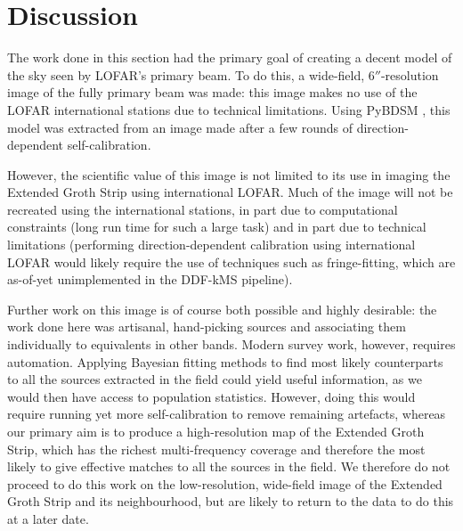 \section{Discussion}

\pg
The work done in this section had the primary goal of creating a decent model of the sky seen by LOFAR's primary beam. To do this, a wide-field, $6''$-resolution image of the fully primary beam was made: this image makes no use of the LOFAR international stations due to technical limitations. Using PyBDSM , this model was extracted from an image made after a few rounds of direction-dependent self-calibration.

\pg
However, the scientific value of this image is not limited to its use in imaging the Extended Groth Strip using international LOFAR. Much of the image will not be recreated using the international stations, in part due to computational constraints (long run time for such a large task) and in part due to technical limitations (performing direction-dependent calibration using international LOFAR would likely require the use of techniques such as fringe-fitting, which are as-of-yet unimplemented in the DDF-kMS pipeline). %

\pg
Further work on this image is of course both possible and highly desirable: the work done here was artisanal, hand-picking sources and associating them individually to equivalents in other bands. Modern survey work, however, requires automation. Applying Bayesian fitting methods to find most likely counterparts to all the sources extracted in the field could yield useful information, as we would then have access to population statistics. However, doing this would require running yet more self-calibration to remove remaining artefacts, whereas our primary aim is to produce a high-resolution map of the Extended Groth Strip, which has the richest multi-frequency coverage and therefore the most likely to give effective matches to all the sources in the field. We therefore do not proceed to do this work on the low-resolution, wide-field image of the Extended Groth Strip and its neighbourhood, but are likely to return to the data to do this at a later date.



\clearpage